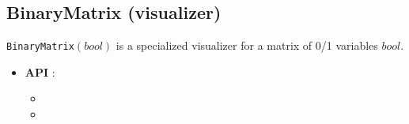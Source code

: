 \subsection{BinaryMatrix (visualizer)}\label{binarymatrix:visu}\hypertarget{binarymatrix:visu}{}
\begin{notedef}
  \texttt{BinaryMatrix}$(bool)$ is a specialized visualizer for a matrix of 0/1 variables $bool$.
\end{notedef}

\begin{itemize}
	\item \textbf{API} : 
	\begin{itemize}
	\item {}
	\item {}
	\end{itemize}
\end{itemize}

%

